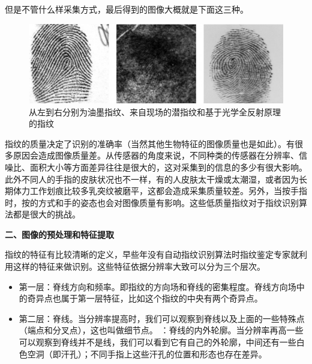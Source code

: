 \documentclass{article}
\begin{document}
	但是不管什么样采集方式，最后得到的图像大概就是下面这三种。\par 
	\begin{figure}[h!]
	\centering
	\includegraphics[scale=0.5]{picoffinger.jpg}
	\caption{从左到右分别为油墨指纹、来自现场的潜指纹和基于光学全反射原理的指纹}
	\label{fig2}
	\end{figure}
	指纹的质量决定了识别的准确率（当然其他生物特征的图像质量也是如此）。有很多原因会造成图像质量差。从传感器的角度来说，不同种类的传感器在分辨率、信噪比、面积大小等方面差异往往是很大的，这对采集到的信息的多少有很大影响。此外不同人的手指的皮肤状况也不一样，有的人皮肤太干燥或太潮湿，或者因为长期体力工作划痕比较多乳突纹被磨平，这都会造成采集质量较差。另外，当按手指时，按的方式和手的姿态也会对图像质量有影响。这些低质量指纹对于指纹识别算法都是很大的挑战。\par
	\noindent\textbf{二、图像的预处理和特征提取\citep{TinghuaUniversity}}\par 
	指纹的特征有比较清晰的定义，早些年没有自动指纹识别算法时指纹鉴定专家就利用这样的特征来做识别。这些特征依据分辨率大致可以分为三个层次。\par 

	\begin{itemize}
		\item 第一层：脊线方向和频率。即指纹的方向场和脊线的密集程度。脊线方向场中的奇异点也属于第一层特征，比如这个指纹的中央有两个奇异点。
		\item 第二层：脊线。当分辨率提高时，我们可以观察到脊线以及上面的一些特殊点（端点和分叉点），这也叫做细节点。
		：脊线的内外轮廓。当分辨率再高一些可以观察到脊线并不是线，我们可以看到它有自己的外轮廓，中间还有一些白色空洞（即汗孔）；不同手指上这些汗孔的位置和形态也存在差异。
	\end{itemize}
\end{document}
